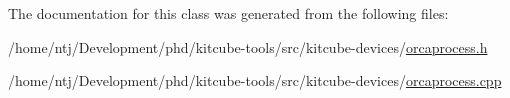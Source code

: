 The documentation for this class was generated from the following files\-:\begin{DoxyCompactItemize}
\item 
/home/ntj/\-Development/phd/kitcube-\/tools/src/kitcube-\/devices/\hyperlink{orcaprocess_8h}{orcaprocess.\-h}\item 
/home/ntj/\-Development/phd/kitcube-\/tools/src/kitcube-\/devices/\hyperlink{orcaprocess_8cpp}{orcaprocess.\-cpp}\end{DoxyCompactItemize}
